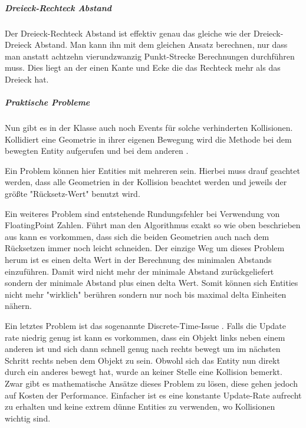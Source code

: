 \subparagraph{Dreieck-Rechteck Abstand}

Der Dreieck-Rechteck Abstand ist effektiv genau das gleiche wie der Dreieck-Dreieck Abstand. Man kann ihn mit dem gleichen Ansatz berechnen, nur dass man anstatt achtzehn vierundzwanzig Punkt-Strecke Berechnungen durchführen muss. Dies liegt an der einen Kante und Ecke die das Rechteck mehr als das Dreieck hat.

\subparagraph{Praktische Probleme}

Nun gibt es in der Klasse  auch noch Events für solche verhinderten Kollisionen. Kollidiert eine Geometrie in ihrer eigenen Bewegung wird die Methode  bei dem bewegten Entity aufgerufen und bei dem anderen .

Ein Problem können hier Entities mit mehreren  sein. Hierbei muss drauf geachtet werden, dass alle Geometrien in der Kollision beachtet werden und jeweils der größte "Rücksetz-Wert" benutzt wird.

Ein weiteres Problem sind entstehende Rundungsfehler bei Verwendung von FloatingPoint Zahlen. Führt man den Algorithmus exakt so wie oben beschrieben aus kann es vorkommen, dass sich die beiden Geometrien auch nach dem Rücksetzen immer noch leicht schneiden. Der einzige Weg um dieses Problem herum ist es einen delta Wert in der Berechnung des minimalen Abstands einzuführen.\cite[S 18]{KRAY} Damit wird nicht mehr der minimale Abstand zurückgeliefert sondern der minimale Abstand plus einen delta Wert. Somit können sich Entities nicht mehr "wirklich" berühren sondern nur noch bis maximal delta Einheiten nähern.

Ein letztes Problem ist das sogenannte Discrete-Time-Issue \cite[S 503]{DGIJ}  \cite[S 14]{ACP}. Falls die Update rate niedrig genug ist kann es vorkommen, dass ein Objekt links neben einem anderen ist und sich dann schnell genug nach rechts bewegt um im nächsten Schritt rechts neben dem Objekt zu sein. Obwohl sich das Entity nun direkt durch ein anderes bewegt hat, wurde an keiner Stelle eine Kollision bemerkt. Zwar gibt es mathematische Ansätze dieses Problem zu lösen, diese gehen jedoch auf Kosten der Performance.\cite[S 11ff]{KRAY} Einfacher ist es eine konstante Update-Rate aufrecht zu erhalten und keine extrem dünne Entities zu verwenden, wo Kollisionen wichtig sind.


